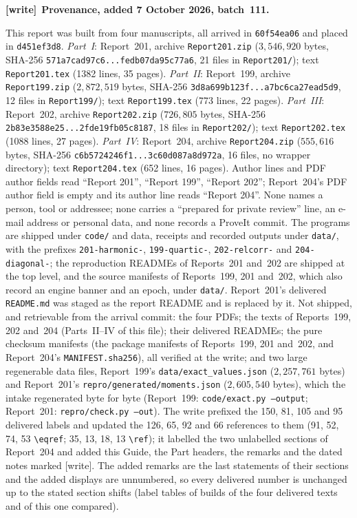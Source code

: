 \documentclass[11pt,letterpaper]{article}
\numberwithin{equation}{section}
\theoremstyle{remark}\newtheorem{remark}[theorem]{Remark}
\newcommand{\file}[1]{\nolinkurl{#1}}
\newenvironment{writenote}[1][]{\par\smallskip\begingroup\small
 \noindent\textbf{[write]}\if\relax\detokenize{#1}\relax\else~\textbf{#1.}\fi\ }%
 {\par\endgroup\smallskip}
\begin{document}
\begin{writenote}[Provenance, added 7 October 2026, batch~111]\raggedright
This report was built from four manuscripts, all arrived in \file{60f54ea06}
and placed in \file{d451ef3d8}. \emph{Part~I}: Report~201, archive
\file{Report201.zip} ($3{,}546{,}920$ bytes, SHA-256
\file{571a7cad97c6...fedb07da95c77a6}, 21 files in \file{Report201/}); text
\file{Report201.tex} (1382 lines, 35 pages). \emph{Part~II}: Report~199,
archive \file{Report199.zip} ($2{,}872{,}519$ bytes, SHA-256
\file{3d8a699b123f...a7bc6ca27ead5d9}, 12 files in \file{Report199/}); text
\file{Report199.tex} (773 lines, 22 pages). \emph{Part~III}: Report~202,
archive \file{Report202.zip} ($726{,}805$ bytes, SHA-256
\file{2b83e3588e25...2fde19fb05c8187}, 18 files in \file{Report202/}); text
\file{Report202.tex} (1088 lines, 27 pages). \emph{Part~IV}: Report~204,
archive \file{Report204.zip} ($555{,}616$ bytes, SHA-256
\file{c6b5724246f1...3c60d087a8d972a}, 16 files, no wrapper directory); text
\file{Report204.tex} (652 lines, 16 pages). Author lines and PDF author fields
read ``Report 201'', ``Report 199'', ``Report 202''; Report~204's PDF author
field is empty and its author line reads ``Report 204''. None names a person,
tool or addressee; none carries a ``prepared for private review'' line, an
e-mail address or personal data, and none records a ProveIt commit. The
programs are shipped under \file{code/} and data, receipts and recorded outputs
under \file{data/}, with the prefixes \file{201-harmonic-}, \file{199-quartic-},
\file{202-relcorr-} and \file{204-diagonal-}; the reproduction READMEs of
Reports~201 and~202 are shipped at the top level, and the source manifests of
Reports~199, 201 and~202, which also record an engine banner and an epoch, under
\file{data/}. Report~201's delivered \file{README.md} was staged as the report
README and is replaced by it. Not shipped, and retrievable from the arrival
commit: the four PDFs; the texts of Reports~199, 202 and~204 (Parts~II--IV of
this file); their delivered READMEs; the pure checksum manifests (the package
manifests of Reports~199, 201 and~202, and Report~204's
\file{MANIFEST.sha256}), all verified at the write; and two large regenerable
data files, Report~199's \file{data/exact_values.json} ($2{,}257{,}761$ bytes)
and Report~201's \file{repro/generated/moments.json} ($2{,}605{,}540$ bytes),
which the intake regenerated byte for byte (Report~199: \texttt{code/exact.py
--output}; Report~201: \texttt{repro/check.py --out}). The write prefixed the
150, 81, 105 and 95 delivered labels and updated the 126, 65, 92 and 66
references to them (91, 52, 74, 53 \verb|\eqref|; 35, 13, 18, 13
\verb|\ref|); it labelled the two unlabelled sections of Report~204 and added
this Guide, the Part headers, the remarks and the dated notes marked [write].
The added remarks are the last statements of their sections and the added
displays are unnumbered, so every delivered number is unchanged up to the
stated section shifts (label tables of builds of the four delivered texts and
of this one compared).


\end{writenote}
\end{document}
